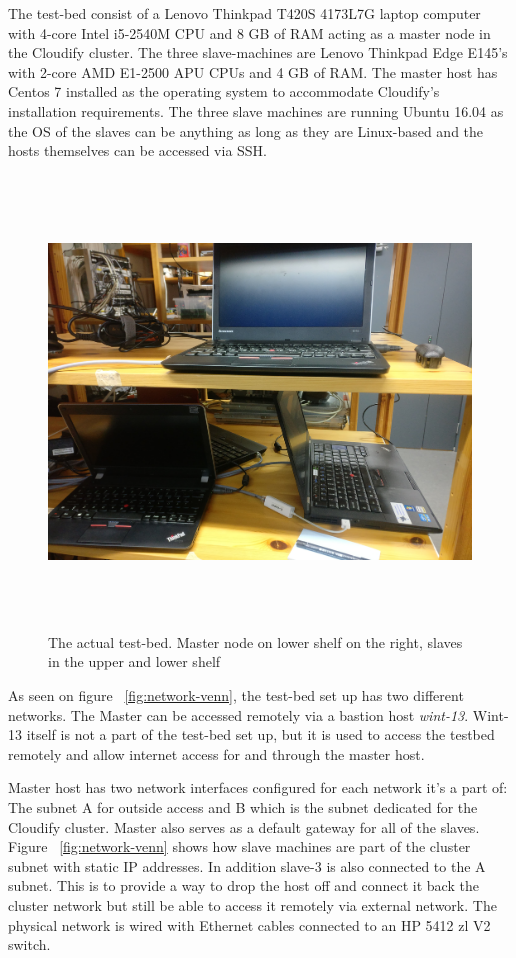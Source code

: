 The test-bed consist of a Lenovo Thinkpad T420S 4173L7G laptop computer with  4-core Intel i5-2540M CPU and 8 GB of RAM acting as a master node in the Cloudify cluster. The three slave-machines are Lenovo Thinkpad Edge E145's with 2-core AMD E1-2500 APU CPUs and 4 GB of RAM. The master host has Centos 7 installed as the operating system to accommodate Cloudify's installation requirements. The three slave machines are running Ubuntu 16.04 as the OS of the slaves can be anything as long as they are Linux-based and the hosts themselves can be accessed via SSH.

\begin{figure}
\centering
  \includegraphics[width=12cm, height=12cm, keepaspectratio]{testbed.jpg}%
  \caption{The actual test-bed. Master node on lower shelf on the right, slaves in the upper and lower shelf}
  \label{fig:test-bed}
\end{figure}

As seen on figure ~\ref{fig:network-venn}, the test-bed set up has two different networks. The Master can be accessed remotely via a bastion host \textit{wint-13}. Wint-13 itself is not a part of the test-bed set up, but it is used to access the testbed remotely and allow internet access for and through the master host.

Master host has two network interfaces configured for each network it's a part of: The subnet A for outside access and B which is the subnet dedicated for the Cloudify cluster. Master also serves as a default gateway for all of the slaves. Figure ~\ref{fig:network-venn} shows how slave machines are part of the cluster subnet with static IP addresses. In addition slave-3 is also connected to the A subnet. This is to provide a way to drop the host off and connect it back the cluster network but still be able to access it remotely via external network. The physical network is wired with Ethernet cables connected to an HP 5412 zl V2 switch.

